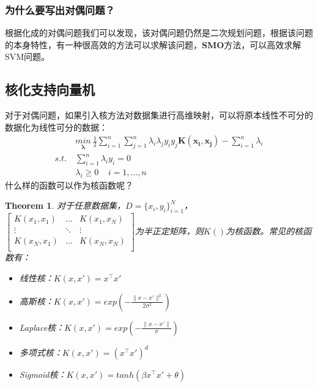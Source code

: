 \documentclass[twoside]{article}
\newtheorem{theorem}{Theorem}
\begin{document}
\subsubsection*{为什么要写出对偶问题？}
根据化成的对偶问题我们可以发现，该对偶问题仍然是二次规划问题，根据该问题的本身特性，有一种很高效的方法可以求解该问题，\textbf{SMO}方法，可以高效求解SVM问题。
\subsection*{核化支持向量机}
对于对偶问题，如果引入核方法对数据集进行高维映射，可以将原本线性不可分的数据化为线性可分的数据：
\begin{equation}
    \begin{aligned}
        &\underset{\boldsymbol{\lambda}}{min}\  \frac{1}{2}\sum_{i=1}^n \sum_{j=1}^n \lambda_i \lambda_j y_i y_j \boldsymbol{  K(x_i,x_j)}- \sum_{i=1}^n \lambda_i\\
        s.t.~&\sum_{i=1}^n\lambda_i y_i =0\\
        & \lambda_i \ge 0  ~~~~~i=1,\ldots,n
    \end{aligned}
\end{equation}
什么样的函数可以作为核函数呢？
\begin{theorem}
    对于任意数据集，$D=\{x_i,y_i\}_{i=1}^N$，$\left[\begin{matrix}
        K(x_1,x_1) & \ldots & K(x_1,x_N)\\
        \vdots& \ddots&\vdots\\
        K(x_N,x_1)&\ldots&K(x_N,x_N)\\
    \end{matrix}\right]$为半正定矩阵，则$K()$为核函数。常见的核函数有：
    \begin{itemize}
        \item 线性核：$K(x,x')=x^\top x'$
        \item 高斯核：$K(x,x')=exp(-\frac{\lVert x-x'\rVert^2}{2\sigma^2})$
        \item Laplace核：$K(x,x')=exp(-\frac{\lVert x-x'\rVert}{\sigma})$
        \item 多项式核：$K(x,x')=(x^\top x')^d$
        \item Sigmoid核：$K(x,x')=tanh(\beta x^\top x'+\theta)$
    \end{itemize}
\end{theorem}
\clearpage
{} \vspace{2mm} \\
\end{document}
